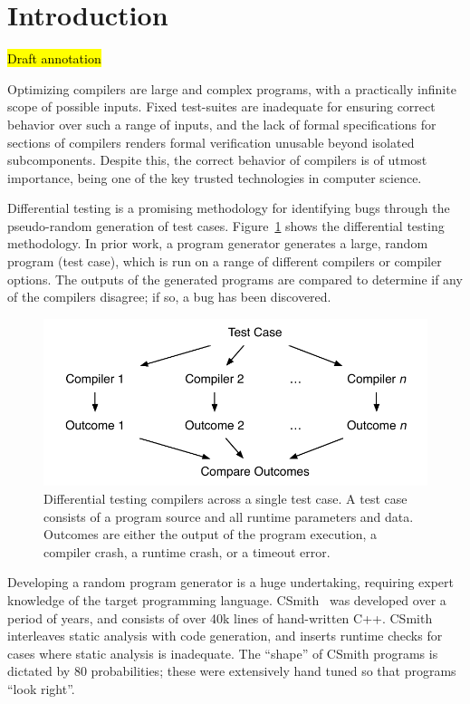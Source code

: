 \section{Introduction}\label{sec:intro}

\hl{Draft annotation}

\noindent
Optimizing compilers are large and complex programs, with a practically infinite scope of possible inputs. Fixed test-suites are inadequate for ensuring correct behavior over such a range of inputs, and the lack of formal specifications for sections of compilers renders formal verification unusable beyond isolated subcomponents. Despite this, the correct behavior of compilers is of utmost importance, being one of the key trusted technologies in computer science.

Differential testing is a promising methodology for identifying bugs through the pseudo-random generation of test cases. Figure~\ref{fig:difftest} shows the differential testing methodology. In prior work, a program generator generates a large, random program (test case), which is run on a range of different compilers or compiler options. The outputs of the generated programs are compared to determine if any of the compilers disagree; if so, a bug has been discovered.

\begin{figure}
	\centering
	\includegraphics[width=.9\columnwidth]{img/difftest} %
	\caption{%
		Differential testing compilers across a single test case. A test case consists of a program source and all runtime parameters and data. Outcomes are either the output of the program execution, a compiler crash, a runtime crash, or a timeout error.%
	}%
	\label{fig:difftest}
\end{figure}

Developing a random program generator is a huge undertaking, requiring expert knowledge of the target programming language. CSmith~\cite{Yang2011} was developed over a period of years, and consists of over 40k lines of hand-written C++. CSmith interleaves static analysis with code generation, and inserts runtime checks for cases where static analysis is inadequate. The ``shape'' of CSmith programs is dictated by 80 probabilities; these were extensively hand tuned so that programs ``look right''.

